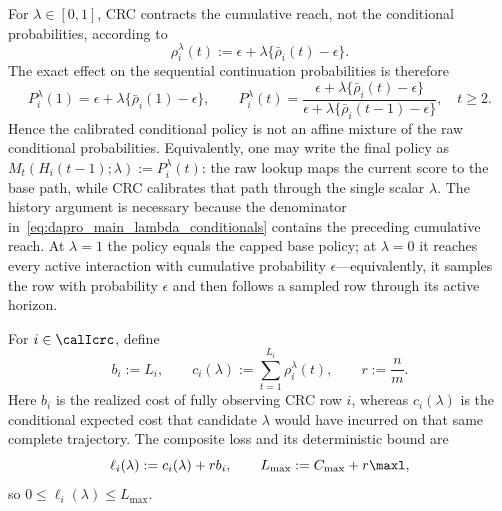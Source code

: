 For $\lambda\in[0,1]$, CRC contracts the cumulative reach, not the
conditional probabilities, according to
\begin{equation}
    \rho_i^\lambda(t)
      :=\epsilon+\lambda\{\bar\rho_i(t)-\epsilon\}.
    \label{eq:dapro_main_lambda_cumulative}
\end{equation}
The exact effect on the sequential continuation probabilities is therefore
\begin{equation}
    P_i^\lambda(1)
      =\epsilon+\lambda\{\bar\rho_i(1)-\epsilon\},
    \qquad
    P_i^\lambda(t)
      =\frac{\epsilon+\lambda\{\bar\rho_i(t)-\epsilon\}}
             {\epsilon+\lambda\{\bar\rho_i(t-1)-\epsilon\}},
      \quad t\geq2.
    \label{eq:dapro_main_lambda_conditionals}
\end{equation}
Hence the calibrated conditional policy is not an affine mixture of the raw
conditional probabilities.  Equivalently, one may write the final policy as
$M_t(H_i(t-1);\lambda):=P_i^\lambda(t)$: the raw lookup maps the current
score to the base path, while CRC calibrates that path through the single
scalar $\lambda$.  The history argument is necessary because the denominator
in~\eqref{eq:dapro_main_lambda_conditionals} contains the preceding cumulative
reach.  At $\lambda=1$ the policy equals the capped base policy;
at $\lambda=0$ it reaches every active interaction with cumulative
probability $\epsilon$---equivalently, it samples the row with probability
$\epsilon$ and then follows a sampled row through its active horizon.

For $i\in\calIcrc$, define
\begin{equation}
    b_i:=L_i,\qquad
    c_i(\lambda):=\sum_{t=1}^{L_i}\rho_i^\lambda(t),
    \qquad r:=\frac{n}{m}.
    \label{eq:dapro_main_crc_costs}
\end{equation}
Here $b_i$ is the realized cost of fully observing CRC row $i$, whereas
$c_i(\lambda)$ is the conditional expected cost that candidate $\lambda$
would have incurred on that same complete trajectory.  The composite loss
and its deterministic bound are
\begin{equation}
    \ell_i(\lambda):=c_i(\lambda)+r b_i,
    \qquad
    L_{\max}:=C_{\max}+r\maxl,
    \label{eq:dapro_main_crc_loss}
\end{equation}
so $0\leq\ell_i(\lambda)\leq L_{\max}$.

